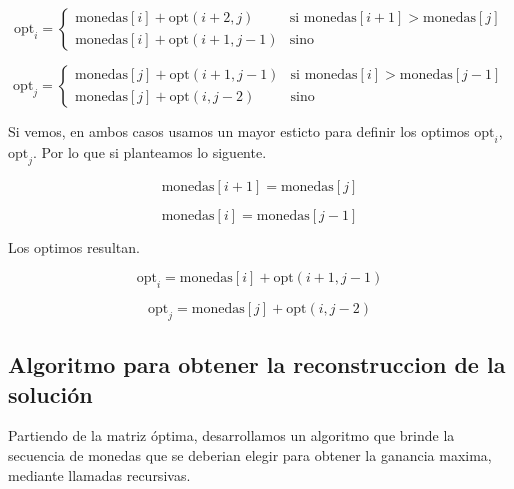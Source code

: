 \[
\text{opt}_i = 
\begin{cases} 
\text{monedas}[i] + \text{opt}(i + 2, j) & \text{si } \text{monedas}[i + 1] > \text{monedas}[j] \\[1ex]
\text{monedas}[i] + \text{opt}(i + 1, j - 1) & \text{sino}
\end{cases}
\]

\[
\text{opt}_j = 
\begin{cases} 
\text{monedas}[j] + \text{opt}(i + 1, j - 1) & \text{si } \text{monedas}[i] > \text{monedas}[j - 1] \\[1ex]
\text{monedas}[j] + \text{opt}(i, j - 2) & \text{sino}
\end{cases}
\]

Si vemos, en ambos casos usamos un mayor esticto para definir los optimos $\text{opt}_i$, $\text{opt}_j$. Por lo que si planteamos lo siguente.

\[
\text{monedas}[i + 1] = \text{monedas}[j]
\]

\[
\text{monedas}[i] = \text{monedas}[j - 1]
\]

Los optimos resultan.

\[
\text{opt}_i = \text{monedas}[i] + \text{opt}(i + 1, j - 1)
\]

\[
\text{opt}_j = \text{monedas}[j] + \text{opt}(i, j - 2)
\]


\subsection{Algoritmo para obtener la reconstruccion de la solución}

Partiendo de la matriz óptima, desarrollamos un algoritmo que brinde la secuencia de monedas que se deberian elegir para obtener la ganancia maxima, mediante llamadas recursivas.

